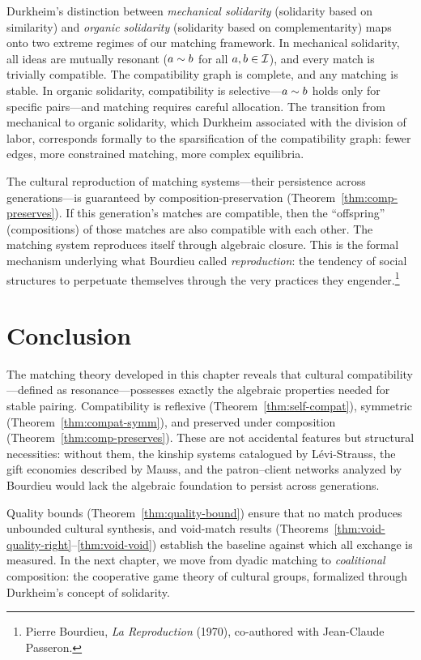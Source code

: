Durkheim's distinction between \emph{mechanical solidarity} (solidarity
based on similarity) and \emph{organic solidarity} (solidarity based on
complementarity) maps onto two extreme regimes of our matching framework.
In mechanical solidarity, all ideas are mutually resonant
($a \sim b$ for all $a, b \in \mathcal{I}$), and every match is trivially
compatible.  The compatibility graph is complete, and any matching is stable.
In organic solidarity, compatibility is selective---$a \sim b$ holds only
for specific pairs---and matching requires careful allocation.  The
transition from mechanical to organic solidarity, which Durkheim associated
with the division of labor, corresponds formally to the sparsification of
the compatibility graph: fewer edges, more constrained matching, more
complex equilibria.

The cultural reproduction of matching systems---their persistence across
generations---is guaranteed by composition-preservation
(Theorem~\ref{thm:comp-preserves}).  If this generation's matches are
compatible, then the ``offspring'' (compositions) of those matches are also
compatible with each other.  The matching system reproduces itself through
algebraic closure.  This is the formal mechanism underlying what Bourdieu
called \emph{reproduction}: the tendency of social structures to perpetuate
themselves through the very practices they engender.\footnote{Pierre
Bourdieu, \textit{La Reproduction} (1970), co-authored with Jean-Claude
Passeron.}

\section{Conclusion}
\label{sec:ch12-conclusion}

The matching theory developed in this chapter reveals that cultural
compatibility---defined as resonance---possesses exactly the algebraic
properties needed for stable pairing.  Compatibility is reflexive
(Theorem~\ref{thm:self-compat}), symmetric
(Theorem~\ref{thm:compat-symm}), and preserved under composition
(Theorem~\ref{thm:comp-preserves}).  These are not accidental features but
structural necessities: without them, the kinship systems catalogued by
Lévi-Strauss, the gift economies described by Mauss, and the patron--client
networks analyzed by Bourdieu would lack the algebraic foundation to persist
across generations.

Quality bounds (Theorem~\ref{thm:quality-bound}) ensure that no match
produces unbounded cultural synthesis, and void-match results
(Theorems~\ref{thm:void-quality-right}--\ref{thm:void-void}) establish the
baseline against which all exchange is measured.  In the next chapter, we
move from dyadic matching to \emph{coalitional} composition: the
cooperative game theory of cultural groups, formalized through Durkheim's
concept of solidarity.
